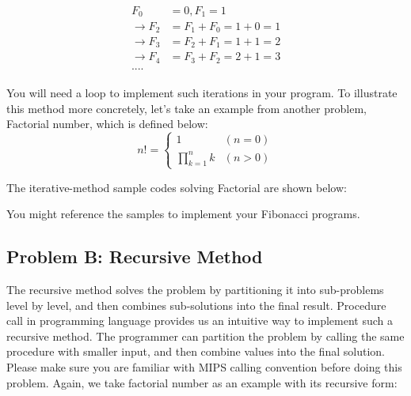 \documentclass{article}
\begin{document}
\begin{align*}
    \begin{aligned}
        F_{0} &= 0, F_{1} = 1 \\
    \rightarrow F_{2} &= F_{1} + F_{0} = 1 + 0 = 1\\
    \rightarrow F_{3} &= F_{2} + F_{1} = 1 + 1 = 2\\
    \rightarrow F_{4} &= F_{3} + F_{2} = 2 + 1 = 3\\
    ....
    \end{aligned}
\end{align*}

You will need a loop to implement such iterations in your program. To illustrate this method more concretely, let's take an example from another problem, Factorial number, which is defined below:
\begin{equation*}
    n! = 
    \begin{cases}
        1 & (n = 0)\\
        \prod^{n}_{k=1}k & (n > 0)
    \end{cases}
\end{equation*}

The iterative-method sample codes solving Factorial are shown below:


You might reference the samples to implement your Fibonacci programs.


\subsection{Problem B: Recursive Method}

The recursive method\cite{recref} solves the problem by partitioning it into sub-problems level by level, and then combines sub-solutions into the final result.
Procedure call in programming language provides us an intuitive way to implement such a recursive method. 
The programmer can partition the problem by calling the same procedure with smaller input, and then combine values into the final solution. Please make sure you are familiar with MIPS calling convention \cite{callref} before doing this problem.
Again, we take factorial number as an example with its recursive form:
\end{document}
